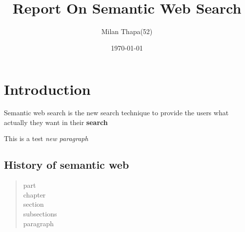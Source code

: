\documentclass[titlepage]{report}
\begin{document}
\title{Report On Semantic Web Search}
\author{Milan Thapa(52)}
\date{\today}
\maketitle
{}
\setcounter{page}{2}
\tableofcontents
\newpage
\section{Introduction}
Semantic web search is the new search technique to provide the users what actually they want in their \textbf{search}

This is a test \textit{new paragraph}
\subsection{History of semantic web}
\begin{quote}
part\\
chapter\\
section\\
subsections\\
paragraph
\end{quote}
\end{document}
